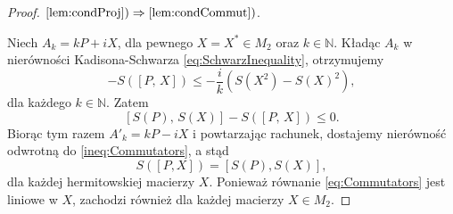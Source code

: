 \begin{proof}
$\ref{lem:condProj}) \Rightarrow \ref{lem:condCommut})$.

Niech $A_{k} = kP + iX$, dla pewnego $X = X^{*} \in M_2$
oraz $k \in \mathbb{N}$.
Kładąc $A_{k}$ w nierówności Kadisona-Schwarza
\eqref{eq:SchwarzInequality}, otrzymujemy
\begin{equation}
[S(P), \,  S(X)] - S([P, \, X]) \leq - \frac{i}{k} (S(X^{2}) - S(X)^{2}),
\end{equation}
dla każdego $k \in \mathbb{N}$.
Zatem
\begin{equation}
\label{ineq:Commutators}
[S(P), \, S(X)] - S([P, \, X]) \leq 0.
\end{equation}
Biorąc tym razem $A'_{k} =kP - i X$ i powtarzając rachunek,
dostajemy nierówność odwrotną do \eqref{ineq:Commutators},
a stąd
\begin{equation}
\label{eq:Commutators}
S([P, X]) = [S(P), S(X)],
\end{equation}
dla każdej hermitowskiej macierzy $X$.
Ponieważ równanie \eqref{eq:Commutators} jest liniowe w $X$,
zachodzi również dla każdej macierzy $X \in M_{2}$.


\end{proof}
